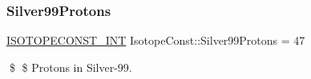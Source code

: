 \subsubsection{\texorpdfstring{Silver99\+Protons}{Silver99Protons}}
{\footnotesize\ttfamily \mbox{\hyperlink{group___isotope_const-_macros_ga5f18360b3e99483a35c32d789e62621c}{I\+S\+O\+T\+O\+P\+E\+C\+O\+N\+S\+T\+\_\+\+I\+NT}} Isotope\+Const\+::\+Silver99\+Protons = 47}

\$ \$ Protons in Silver-\/99. 
